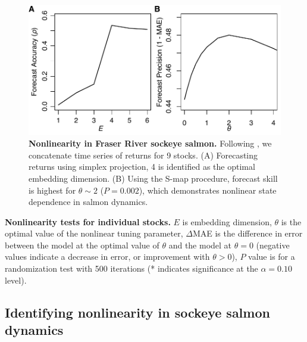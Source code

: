 \begin{figure}[!ht]
\begin{center}\includegraphics[width=\maxwidth{\textwidth}]{fig_salmon_s2.pdf}\end{center}
\caption[Nonlinearity in Fraser River sockeye salmon.]{\textbf{Nonlinearity in Fraser River sockeye salmon.}\newline
Following \cite{Hsieh_2008}, we concatenate time series of returns for 9 stocks. (A) Forecasting returns using simplex projection, 4 is identified as the optimal embedding dimension. (B) Using the S-map procedure, forecast skill is highest for $\theta \sim 2$ ($P = 0.002$), which demonstrates nonlinear state dependence in salmon dynamics.}
\label{fig_salmon_nonlinearity}
\end{figure}

\begin{table}
\caption[Nonlinearity tests for individual stocks.]{\textbf{Nonlinearity tests for individual stocks.}\newline
$E$ is embedding dimension, $\theta$ is the optimal value of the nonlinear tuning parameter, $\Delta$MAE is the difference in error between the model at the optimal value of $\theta$ and the model at $\theta = 0$ (negative values indicate a decrease in error, or improvement with $\theta > 0$), $P$ value is for a randomization test with 500 iterations (* indicates significance at the $\alpha = 0.10$ level).}
\label{tab_salmon_nonlinearity}

\begin{center}

\end{center}
\end{table}

\subsection{Identifying nonlinearity in sockeye salmon dynamics}

